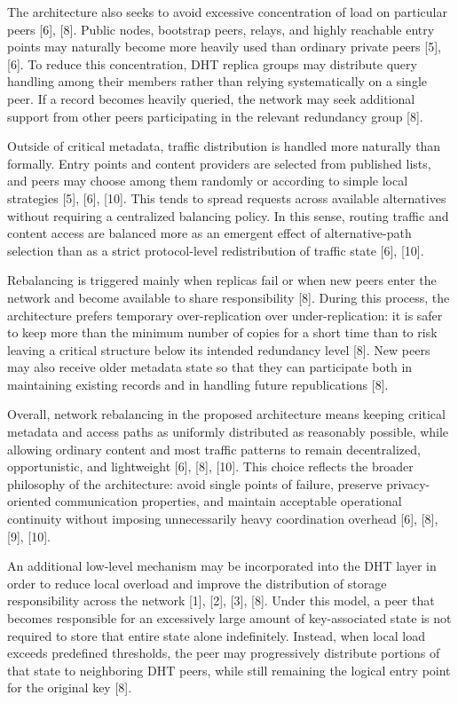 \documentclass[12pt,a4paper]{article}
\begin{document}
The architecture also seeks to avoid excessive concentration of load on particular peers [6], [8]. Public nodes, bootstrap peers, relays, and highly reachable entry points may naturally become more heavily used than ordinary private peers [5], [6]. To reduce this concentration, DHT replica groups may distribute query handling among their members rather than relying systematically on a single peer. If a record becomes heavily queried, the network may seek additional support from other peers participating in the relevant redundancy group [8].

Outside of critical metadata, traffic distribution is handled more naturally than formally. Entry points and content providers are selected from published lists, and peers may choose among them randomly or according to simple local strategies [5], [6], [10]. This tends to spread requests across available alternatives without requiring a centralized balancing policy. In this sense, routing traffic and content access are balanced more as an emergent effect of alternative-path selection than as a strict protocol-level redistribution of traffic state [6], [10].

Rebalancing is triggered mainly when replicas fail or when new peers enter the network and become available to share responsibility [8]. During this process, the architecture prefers temporary over-replication over under-replication: it is safer to keep more than the minimum number of copies for a short time than to risk leaving a critical structure below its intended redundancy level [8]. New peers may also receive older metadata state so that they can participate both in maintaining existing records and in handling future republications [8].

Overall, network rebalancing in the proposed architecture means keeping critical metadata and access paths as uniformly distributed as reasonably possible, while allowing ordinary content and most traffic patterns to remain decentralized, opportunistic, and lightweight [6], [8], [10]. This choice reflects the broader philosophy of the architecture: avoid single points of failure, preserve privacy-oriented communication properties, and maintain acceptable operational continuity without imposing unnecessarily heavy coordination overhead [6], [8], [9], [10].

An additional low-level mechanism may be incorporated into the DHT layer in order to reduce local overload and improve the distribution of storage responsibility across the network [1], [2], [3], [8]. Under this model, a peer that becomes responsible for an excessively large amount of key-associated state is not required to store that entire state alone indefinitely. Instead, when local load exceeds predefined thresholds, the peer may progressively distribute portions of that state to neighboring DHT peers, while still remaining the logical entry point for the original key [8].
\end{document}
